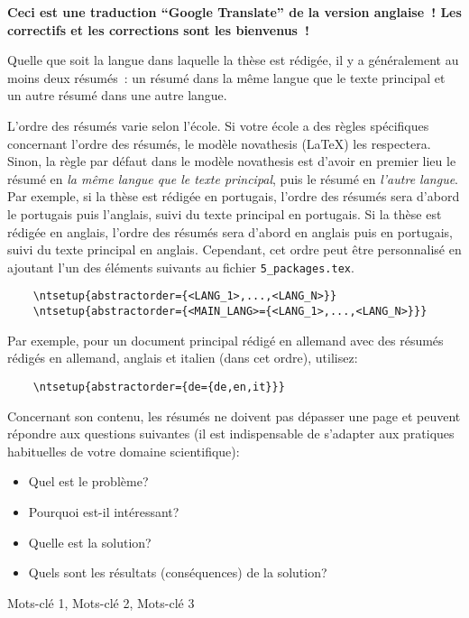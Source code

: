 
%

\textbf{Ceci est une traduction “Google Translate” de la version anglaise ! Les correctifs et les corrections sont les bienvenus !}

Quelle que soit la langue dans laquelle la thèse est rédigée, il y a généralement au moins deux résumés : un résumé dans la même langue que le texte principal et un autre résumé dans une autre langue.

L'ordre des résumés varie selon l'école. Si votre école a des règles spécifiques concernant l'ordre des résumés, le modèle \gls{novathesis} (\LaTeX) les respectera. Sinon, la règle par défaut dans le modèle \gls{novathesis} est d'avoir en premier lieu le résumé en \emph{la même langue que le texte principal}, puis le résumé en \emph{l'autre langue}. Par exemple, si la thèse est rédigée en portugais, l'ordre des résumés sera d'abord le portugais puis l'anglais, suivi du texte principal en portugais. Si la thèse est rédigée en anglais, l'ordre des résumés sera d'abord en anglais puis en portugais, suivi du texte principal en anglais.
%
Cependant, cet ordre peut être personnalisé en ajoutant l'un des éléments suivants au fichier \verb+5_packages.tex+.

\begin{verbatim}
    \ntsetup{abstractorder={<LANG_1>,...,<LANG_N>}}
    \ntsetup{abstractorder={<MAIN_LANG>={<LANG_1>,...,<LANG_N>}}}
\end{verbatim}

Par exemple, pour un document principal rédigé en allemand avec des résumés rédigés en allemand, anglais et italien (dans cet ordre), utilisez:
\begin{verbatim}
    \ntsetup{abstractorder={de={de,en,it}}}
\end{verbatim}

Concernant son contenu, les résumés ne doivent pas dépasser une page et peuvent répondre aux questions suivantes (il est indispensable de s'adapter aux pratiques habituelles de votre domaine scientifique):

\begin{itemize}
  \item Quel est le problème?
  \item Pourquoi est-il intéressant?
  \item Quelle est la solution?
  \item Quels sont les résultats (conséquences) de la solution?
\end{itemize}

\begin{keywords}
Mots-clé 1, Mots-clé 2, Mots-clé 3
\end{keywords}
